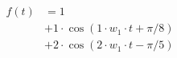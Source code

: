 \begin{center}
\begin{align*}
f(t) &= 1 \\
&+ 1 \cdot \cos( 1 \cdot w_1 \cdot t + \pi/8) \\
&+ 2 \cdot \cos( 2 \cdot w_1 \cdot t - \pi/5)
\end{align*}
\end{center}
